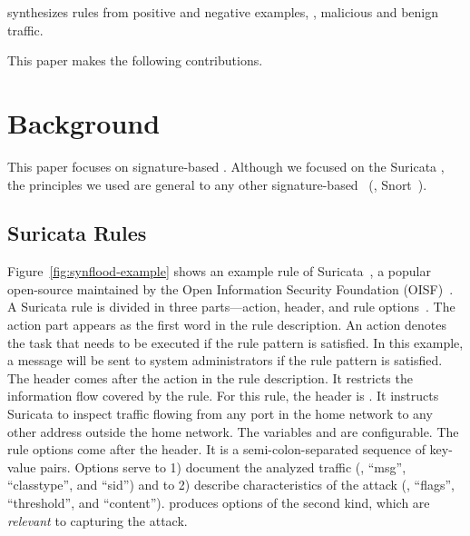 \documentclass[runningheads]{llncs}
\begin{document}

\tname{} synthesizes rules from positive and negative examples, \ie{},
malicious and benign traffic.



This paper makes the following contributions.

\section{Background}

This paper focuses on signature-based \nids. Although we focused on
the Suricata \nids, the principles we used are general to any other
signature-based \nids~(\eg{}, Snort~\cite{snort}).

\subsection{Suricata Rules}
\label{sec:example-suricata-rules}

Figure~\ref{fig:synflood-example} shows an example rule of
Suricata~\cite{suricata}, a popular open-source \nids{} maintained by
the Open Information Security Foundation (OISF)~\cite{oisf}. A
Suricata rule is divided in three parts---action, header, and rule
options~\cite{suri-rule-format}. The action part appears as the first
word in the rule description. An action denotes the task that needs to
be executed if the rule pattern is satisfied. In this example, a
message will be sent to system administrators if the rule pattern is
satisfied. The header comes after the action in the rule
description. It restricts the information flow covered by the
rule. For this rule, the header is . It instructs Suricata to inspect 
traffic flowing from any port in the home network to any other address
outside the home network. The variables  and
 are configurable. The rule options come after
the header. It is a semi-colon-separated sequence of key-value
pairs. Options serve to 1) document the analyzed traffic (\eg{},
``msg'', ``classtype'', and ``sid'') and to 2) describe
characteristics of the attack (\eg, ``flags'', ``threshold'', and
``content''). \tname{} produces options of the second kind, which are
\emph{relevant} to capturing the attack.
\end{document}
